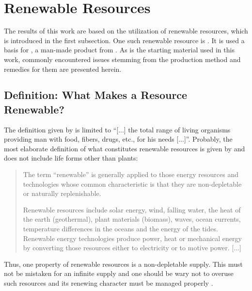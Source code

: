 \section{Renewable Resources\label{sec-intro-renewable}}
The results of this work are based on the utilization of renewable resources, which is introduced in the first subsection. One such renewable resource is \lcbm{}. It is used a basis for \lch{}, a man-made product from \lcbm{}. As \lch{} is the starting material used in this work, commonly encountered issues stemming from the production method and remedies for them are presented herein.

\subsection{Definition: What Makes a Resource Renewable?\label{subsec-intro-renewable-def}}
The definition given by \textcite{Weiss1962} is limited to \enquote{[...] the total range of living organisms providing man with food, fibers, drugs, etc., for his needs [...]}. Probably, the most elaborate definition of what constitutes renewable resources is given by \textcite{Armstrong1999} and does not include life forms other than plants:
\begin{quote}
The term \enquote{renewable} is generally applied to those energy resources and technologies whose common characteristic is that they are non-depletable or naturally replenishable.

Renewable resources include solar energy, wind, falling water, the heat of the earth (geothermal), plant materials (biomass), waves, ocean currents, temperature differences in the oceans and the energy of the tides. Renewable energy technologies produce power, heat or mechanical energy by converting those resources either to electricity or to motive power. [...]
\end{quote}

Thus, one property of renewable resources is a non-depletable supply. This must not be mistaken for an infinite supply and one should be wary not to overuse such resources and its renewing character must be managed properly \cite{Moxnes1998}.

